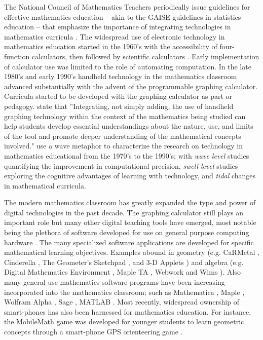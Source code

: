 The National Council of Mathematics Teachers periodically issue guidelines for effective mathematics education -- akin to the GAISE guidelines in statistics education -- that emphasize the importance of integrating technologies in mathematics curricula \citep{nctm2000standards}. The widespread use of electronic technology in mathematics education started in the 1960's with the accessibility of four-function calculators, then followed by scientific calculators \citep{trouche2010handheld}. Early implementation of calculator use was limited to the role of automating computation. In the late 1980's and early 1990's handheld technology in the mathematics classroom advanced substantially with the advent of the programmable graphing calculator. Curricula started to be developed with the graphing calculator as part or pedagogy. \citet{burrill2002handheld} state that ''Integrating, not simply adding, the use of handheld graphing technology within the context of the mathematics being studied can help students develop essential understandings about the nature, use, and limits of the tool and promote deeper understanding of the mathematical concepts involved." \citet{kaput1994technology} use a wave metaphor to characterize the research on technology in mathematics educational from the 1970's to the 1990's; with \textit{wave level} studies quantifying the improvement in computational precision, \textit{swell level} studies exploring the cognitive advantages of learning with technology, and \textit{tidal} changes in mathematical curricula.  

The modern mathematics classroom has greatly expanded the type and power of digital technologies in the past decade. The graphing calculator still plays an important role but many other digital teaching tools have emerged, most notable being the plethora of software developed for use on general purpose computing hardware \citep{trouche2010handheld}. The many specialized software applications are developed for specific mathematical learning objectives. Examples abound in geometry (e.g. CaRMetal \citep{CaRMetal}, Cinderella \citep{cinderella}, The Geometer's Sketchpad \citep{jackiw2002geometer}, and 3-D Applets \citep{boon2009designer}) and algebra (e.g. Digital Mathematics Environment \citep{DME}, Maple TA \citep{MapleTA}, Webwork \citep{gage2002webwork} and Wims \citep{wims}). Also many general use mathematics software programs have been increasing incorporated into the mathematics classroom; such as Mathematica \citep{Mathematica}, Maple \citep{Maple}, Wolfram Alpha \citep{wolframalpha}, Sage \citep{sage}, MATLAB \citep{MATLAB}. Most recently, widespread ownership of smart-phones has also been harnessed for mathematics education. For instance, the MobileMath game was developed for younger students to learn geometric concepts through a smart-phone GPS orienteering game \citep{wijers2010mobilemath}. 

